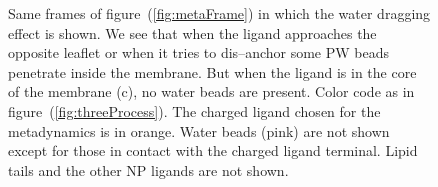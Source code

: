 \begin{figure}[!ht]
{	}%
	\caption{Same frames of figure~(\ref{fig:metaFrame}) in which the water dragging effect is shown. We see that when the ligand approaches the opposite leaflet or when it tries to dis--anchor some \acs{PW} beads penetrate inside the membrane. But when the ligand is in the core of the membrane (c), no water beads are present. Color code as in figure~(\ref{fig:threeProcess}). The charged ligand chosen for the metadynamics is in orange. Water beads (pink) are not shown except for those in contact with the charged ligand terminal. Lipid tails and the other \acs{NP} ligands are not shown.}%
	\label{fig:PWDragging}
\end{figure}
\begin{figure}[ht!]
	\center
	\\%
\end{figure}
